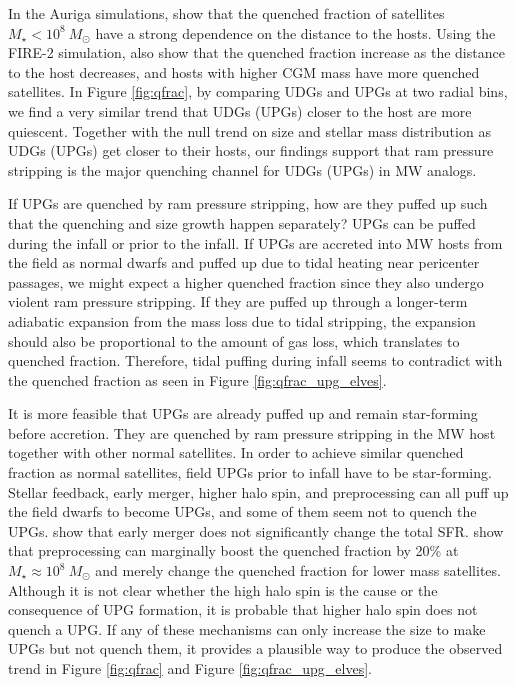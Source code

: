 \documentclass[twocolumn,astrosymb,twocolappendix]{aastex631}
\begin{document}
\begin{CJK*}{UTF8}{gbsn}
In the Auriga simulations, \citet{Simpson2018} show that the quenched fraction of satellites $M_\star < 10^8\ M_\odot$ have a strong dependence on the distance to the hosts. Using the FIRE-2 simulation, \citet{Samuel2022} also show that the quenched fraction increase as the distance to the host decreases, and hosts with higher CGM mass have more quenched satellites. In Figure \ref{fig:qfrac}, by comparing UDGs and UPGs at two radial bins, we find a very similar trend that UDGs (UPGs) closer to the host are more quiescent.
Together with the null trend on size and stellar mass distribution as UDGs (UPGs) get closer to their hosts, our findings support that ram pressure stripping is the major quenching channel for UDGs (UPGs) in MW analogs. 


If UPGs are quenched by ram pressure stripping, how are they puffed up such that the quenching and size growth happen separately? UPGs can be puffed during the infall or prior to the infall. If UPGs are accreted into MW hosts from the field as normal dwarfs and puffed up due to tidal heating near pericenter passages, we might expect a higher quenched fraction since they also undergo violent ram pressure stripping. If they are puffed up through a longer-term adiabatic expansion from the mass loss due to tidal stripping, the expansion should also be proportional to the amount of gas loss, which translates to quenched fraction. Therefore, tidal puffing during infall seems to contradict with the quenched fraction as seen in Figure \ref{fig:qfrac_upg_elves}.

It is more feasible that UPGs are already puffed up and remain star-forming before accretion. They are quenched by ram pressure stripping in the MW host together with other normal satellites. In order to achieve similar quenched fraction as normal satellites, field UPGs prior to infall have to be star-forming. Stellar feedback, early merger, higher halo spin, and preprocessing can all puff up the field dwarfs to become UPGs, and some of them seem not to quench the UPGs. \citet{Wright2021} show that early merger does not significantly change the total SFR. \citet{Samuel2022} show that preprocessing can marginally boost the quenched fraction by 20\% at $M_\star \approx 10^8\ M_\odot$ and merely change the quenched fraction for lower mass satellites. Although it is not clear whether the high halo spin is the cause or the consequence of UPG formation, it is probable that higher halo spin does not quench a UPG. If any of these mechanisms can only increase the size to make UPGs but not quench them, it provides a plausible way to produce the observed trend in Figure \ref{fig:qfrac} and Figure \ref{fig:qfrac_upg_elves}.


\end{CJK*}
\end{document}
